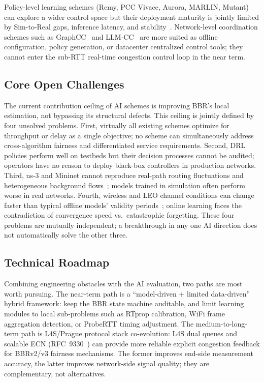 \documentclass[a4paper,fleqn]{cas-sc}
\begin{document}
Policy-level learning schemes (Remy, PCC Vivace, Aurora, MARLIN, Mutant) can
explore a wider control space but their deployment maturity is jointly limited by
Sim-to-Real gaps, inference latency, and
stability~\citep{winstein2013remy,dong2018vivace,jay2019aurora,galliera2023marlin,pappone2025mutant}.
Network-level coordination schemes such as GraphCC~\citep{bernardez2025graphcc}
and LLM-CC~\citep{huang2024llm} are more suited as offline configuration, policy
generation, or datacenter centralized control tools; they cannot enter the
sub-RTT real-time congestion control loop in the near term.

\subsection{Core Open Challenges}
\label{sec:ai_challenges}

The current contribution ceiling of AI schemes is improving BBR's local
estimation, not bypassing its structural defects. This ceiling is jointly defined
by four unsolved problems. First, virtually all existing schemes optimize for
throughput or delay as a single objective; no scheme can simultaneously address
cross-algorithm fairness and differentiated service requirements. Second, DRL
policies perform well on testbeds but their decision processes cannot be audited;
operators have no reason to deploy black-box controllers in production networks.
Third, ns-3 and Mininet cannot reproduce real-path routing fluctuations and
heterogeneous background flows~\citep{jiang2021mlcc}; models trained in simulation
often perform worse in real networks. Fourth, wireless and LEO channel conditions
can change faster than typical offline models' validity periods~\citep{jiang2021mlcc,kamel2024starquic,laniewski2024road}; online learning faces the
contradiction of convergence speed vs.\ catastrophic forgetting. These four
problems are mutually independent; a breakthrough in any one AI direction does not
automatically solve the other three.

\subsection{Technical Roadmap}
\label{sec:ai_roadmap}

Combining engineering obstacles with the AI evaluation, two paths are most worth
pursuing. The near-term path is a ``model-driven + limited data-driven'' hybrid
framework: keep the BBR state machine auditable, and limit learning modules to
local sub-problems such as RTprop calibration, WiFi frame aggregation detection,
or ProbeRTT timing adjustment. The medium-to-long-term path is L4S/Prague
protocol stack co-evolution: L4S dual queues and scalable ECN
(RFC~9330~\citep{rfc9330}) can provide more reliable explicit congestion feedback
for BBRv2/v3 fairness mechanisms. The former improves end-side measurement
accuracy, the latter improves network-side signal quality; they are complementary,
not alternatives.
\end{document}
